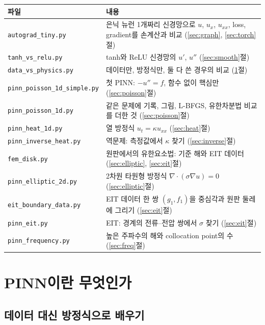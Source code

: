 \documentclass[11pt,a4paper]{article}
\begin{document}
\begin{center}
\begin{tabular}{@{}lp{100mm}@{}}
\toprule
파일 & 내용 \\
\midrule
\texttt{autograd\_tiny.py} & 은닉 뉴런 1개짜리 신경망으로 $u$, $u_x$, $u_{xx}$, loss, gradient를 손계산과 비교 (\ref{sec:graph}, \ref{sec:torch}절) \\
\texttt{tanh\_vs\_relu.py} & tanh와 ReLU 신경망의 $u'$, $u''$ (\ref{sec:smooth}절) \\
\texttt{data\_vs\_physics.py} & 데이터만, 방정식만, 둘 다 쓴 경우의 비교 (\ref{sec:why}절) \\
\texttt{pinn\_poisson\_1d\_simple.py} & 첫 PINN: $-u''=f$, 함수 없이 핵심만 (\ref{sec:poisson}절) \\
\texttt{pinn\_poisson\_1d.py} & 같은 문제에 기록, 그림, L-BFGS, 유한차분법 비교를 더한 것 (\ref{sec:poisson}절) \\
\texttt{pinn\_heat\_1d.py} & 열 방정식 $u_t=\kappa u_{xx}$ (\ref{sec:heat}절) \\
\texttt{pinn\_inverse\_heat.py} & 역문제: 측정값에서 $\kappa$ 찾기 (\ref{sec:inverse}절) \\
\texttt{fem\_disk.py} & 원판에서의 유한요소법: 기준 해와 EIT 데이터 (\ref{sec:elliptic}, \ref{sec:eit}절) \\
\texttt{pinn\_elliptic\_2d.py} & 2차원 타원형 방정식 $\nabla\cdot(\sigma\nabla u)=0$ (\ref{sec:elliptic}절) \\
\texttt{eit\_boundary\_data.py} & EIT 데이터 한 쌍 $(g_1,f_1)$을 중심각과 원판 둘레에 그리기 (\ref{sec:eit}절) \\
\texttt{pinn\_eit.py} & EIT: 경계의 전류--전압 쌍에서 $\sigma$ 찾기 (\ref{sec:eit}절) \\
\texttt{pinn\_frequency.py} & 높은 주파수의 해와 collocation point의 수 (\ref{sec:freq}절) \\
\bottomrule
\end{tabular}
\end{center}

\section{PINN이란 무엇인가}\label{sec:why}

\subsection{데이터 대신 방정식으로 배우기}
\end{document}
